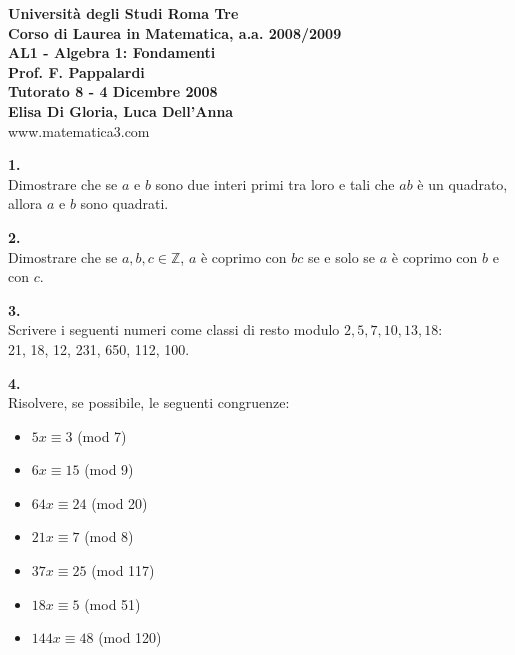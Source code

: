 \documentclass[italian,a4paper,11pt]
{article}
\newcommand{\Z}{\mathbb Z}
\begin{document}
\begin{center}


\textbf{Universit\`a degli Studi Roma Tre}\\

\textbf{Corso di Laurea in Matematica, a.a. 2008/2009}\\

\textbf{AL1 - Algebra 1: Fondamenti}\\

\textbf{Prof. F. Pappalardi}\\

\textbf{Tutorato 8 - 4 Dicembre 2008}\\

\textbf{Elisa Di Gloria, Luca Dell'Anna}\\

www.matematica3.com\\
\end{center}



\vspace{0.5cm}




\noindent
\begin{Ex}\textbf{ 1.}\\
Dimostrare che se $a$ e $b$ sono due interi primi tra loro e tali che $ab$ \`e un quadrato, allora $a$ e $b$ sono quadrati.
\end{Ex}

\vspace{0.4cm}
\noindent
\begin{Ex}\textbf{ 2.}\\
Dimostrare che se $a,b,c \in \Z$, $a$ \`e coprimo con $bc$ se e solo se $a$ \`e coprimo con $b$ e con $c$.
\end{Ex}

\vspace{0.4cm}
\noindent
\begin{Ex}\textbf{ 3.}\\
Scrivere i seguenti numeri come classi di resto modulo $2,5,7,10,13,18$:\\
21, 18, 12, 231, 650, 112, 100.
\end{Ex}


\vspace{0.4cm}
\noindent
\begin{Ex}\textbf{ 4.}\\
Risolvere, se possibile, le seguenti congruenze:
\begin{itemize}
	\item $5x\equiv 3$ (mod 7)
	\item $6x\equiv 15$ (mod 9)
	\item $64x\equiv 24$ (mod 20)
	\item $21x\equiv 7$ (mod 8)
	\item $37x\equiv 25$ (mod 117)
	\item $18x\equiv 5$ (mod 51)
	\item $144x\equiv 48$ (mod 120)
\end{itemize}
\end{Ex}
\end{document}
